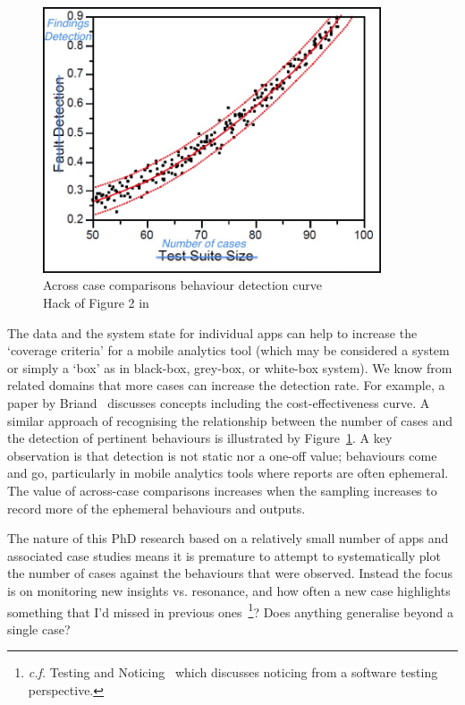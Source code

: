 \begin{figure}
    \centering
    \includegraphics[width=10cm]{images/rough-sketches/across-case-comparisons.jpg}
    \caption{Across case comparisons behaviour detection curve \\Hack of Figure 2 in \citep[p.2]{briand2007_a_critical_analysis_of_empirical_research_in_software_testing}}
    \label{fig:across-case-comparisons-behaviour-detection-curve}
\end{figure}

The data and the system state for individual apps can help to increase the `coverage criteria' for a mobile analytics tool (which may be considered a system or simply a `box' as in black-box, grey-box, or white-box system). We know from related domains that more cases can increase the detection rate. For example, a paper by Briand~\citet{briand2007_a_critical_analysis_of_empirical_research_in_software_testing} discusses concepts including the cost-effectiveness curve. A similar approach of recognising the relationship between the number of cases and the detection of pertinent behaviours is illustrated by Figure~\ref{fig:across-case-comparisons-behaviour-detection-curve}. A key observation is that detection is not static nor a one-off value; behaviours come and go, particularly in mobile analytics tools where reports are often ephemeral. The value of across-case comparisons increases when the sampling increases to record more of the ephemeral behaviours and outputs.

The nature of this PhD research based on a relatively small number of apps and associated case studies means it is premature to attempt to systematically plot the number of cases against the behaviours that were observed. Instead the focus is on monitoring 
new insights vs. resonance, and how often a new case highlights something that I'd missed in previous ones~\footnote{\textit{c.f.} Testing and Noticing~\citep{bolton2009_testing_and_noticing} which discusses noticing from a software testing perspective.}? Does anything generalise beyond a single case? %

